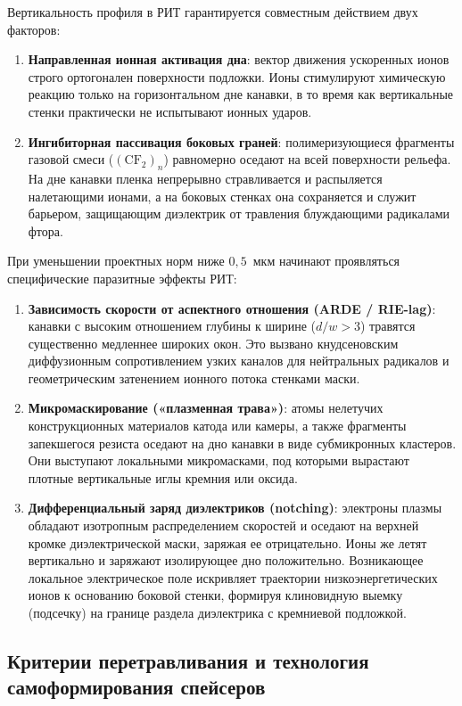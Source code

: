 \documentclass[12pt,a4paper]{article}
\theoremstyle{plain}
\theoremstyle{definition}
\theoremstyle{remark}
\numberwithin{equation}{section}
\begin{document}
Вертикальность профиля в РИТ гарантируется совместным действием двух факторов:
\begin{enumerate}
  \item \textbf{Направленная ионная активация дна}: вектор движения ускоренных ионов строго ортогонален поверхности подложки. Ионы стимулируют химическую реакцию только на горизонтальном дне канавки, в то время как вертикальные стенки практически не испытывают ионных ударов.
  \item \textbf{Ингибиторная пассивация боковых граней}: полимеризующиеся фрагменты газовой смеси ($(\mathrm{CF}_2)_n$) равномерно оседают на всей поверхности рельефа. На дне канавки пленка непрерывно стравливается и распыляется налетающими ионами, а на боковых стенках она сохраняется и служит барьером, защищающим диэлектрик от травления блуждающими радикалами фтора.
\end{enumerate}

При уменьшении проектных норм ниже $0{,}5$~мкм начинают проявляться специфические паразитные эффекты РИТ:
\begin{enumerate}
  \item \textbf{Зависимость скорости от аспектного отношения (ARDE / RIE-lag)}: канавки с высоким отношением глубины к ширине ($d / w > 3$) травятся существенно медленнее широких окон. Это вызвано кнудсеновским диффузионным сопротивлением узких каналов для нейтральных радикалов и геометрическим затенением ионного потока стенками маски.
  \item \textbf{Микромаскирование («плазменная трава»)}: атомы нелетучих конструкционных материалов катода или камеры, а также фрагменты запекшегося резиста оседают на дно канавки в виде субмикронных кластеров. Они выступают локальными микромасками, под которыми вырастают плотные вертикальные иглы кремния или оксида.
  \item \textbf{Дифференциальный заряд диэлектриков (notching)}: электроны плазмы обладают изотропным распределением скоростей и оседают на верхней кромке диэлектрической маски, заряжая ее отрицательно. Ионы же летят вертикально и заряжают изолирующее дно положительно. Возникающее локальное электрическое поле искривляет траектории низкоэнергетических ионов к основанию боковой стенки, формируя клиновидную выемку (подсечку) на границе раздела диэлектрика с кремниевой подложкой.
\end{enumerate}

\subsection{Критерии перетравливания и технология самоформирования спейсеров}
\end{document}
